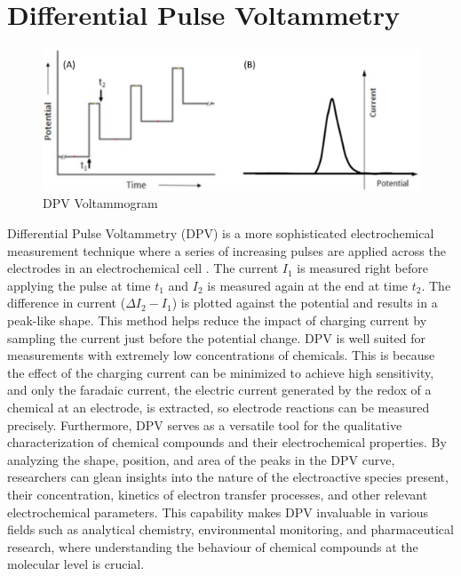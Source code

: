 \section{Differential Pulse Voltammetry}
\begin{figure}[h!]
  \centering
    \includegraphics[width=1.0\textwidth]{figures/dpv.jpg}
    \caption{DPV Voltammogram}
    \label{dpv_example}
\end{figure}
Differential Pulse Voltammetry (DPV) is a more sophisticated electrochemical measurement technique where a series of increasing pulses are applied across the electrodes in an electrochemical cell \cite{Scholz2005-pa}. The current $I_1$ is measured right before applying the pulse at time $t_1$ and $I_2$ is measured again at the end at time $t_2$. The difference in current ($\Delta I_2 - I_1$) is plotted against the potential and results in a peak-like shape. 
This method helps reduce the impact of charging current by sampling the current just before the potential change. DPV is well suited for measurements with extremely low concentrations of chemicals. This is because the effect of the charging current can be minimized to achieve high sensitivity, and only the faradaic current, the electric current generated by the redox of a chemical at an electrode, is extracted, so electrode reactions can be measured precisely. 
Furthermore, DPV serves as a versatile tool for the qualitative characterization of chemical compounds and their electrochemical properties. By analyzing the shape, position, and area of the peaks in the DPV curve, researchers can glean insights into the nature of the electroactive species present, their concentration, kinetics of electron transfer processes, and other relevant electrochemical parameters. This capability makes DPV invaluable in various fields such as analytical chemistry, environmental monitoring, and pharmaceutical research, where understanding the behaviour of chemical compounds at the molecular level is crucial.